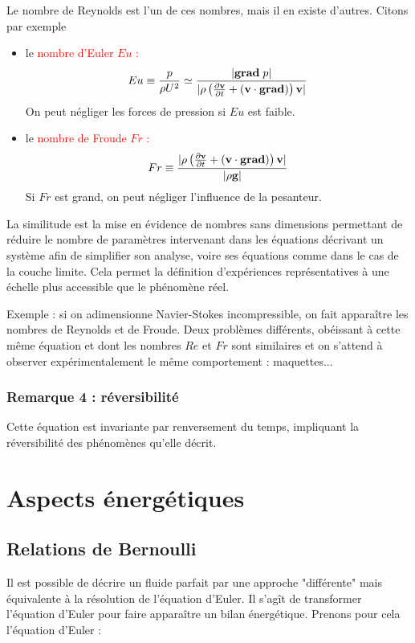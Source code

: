 \documentclass[11pt,a4paper]{report}
\begin{document}
Le nombre de Reynolds est l'un de ces nombres, mais il en existe d'autres. Citons par exemple
\begin{itemize}
	\item le \textcolor{red}{nombre d'Euler $Eu$ :}
	\begin{equation}
		\displaystyle{Eu \equiv \frac{p}{\rho U^2} \simeq \frac{|\textbf{grad}\;p|}{|\rho\left(\frac{\partial \bold{v}}{\partial t} 
		+ \left(\bold{v}\cdot\textbf{grad}\right)\right)\bold{v}|}}
	\end{equation}
	On peut négliger les forces de pression si $Eu$ est faible.
	\item le \textcolor{red}{nombre de Froude $Fr$ :}
	\begin{equation}
		\displaystyle{Fr \equiv \frac{|\rho\left(\frac{\partial \bold{v}}{\partial t} 
		+ \left(\bold{v}\cdot\textbf{grad}\right)\right)\bold{v}|}{|\rho \bold{g}|}}
	\end{equation}
	Si $Fr$ est grand, on peut négliger l'influence de la pesanteur.\\
\end{itemize}

La similitude est la mise en évidence de nombres sans dimensions permettant de réduire le nombre de paramètres intervenant dans les équations décrivant un système afin de simplifier son analyse, voire ses équations comme dans le cas de la couche limite. Cela permet la définition d'expériences représentatives à une échelle plus accessible que le phénomène réel.

Exemple : si on adimensionne Navier-Stokes incompressible, on fait apparaître les nombres de Reynolds et de Froude. Deux problèmes différents, obéissant à cette même équation et dont les nombres $Re$ et $Fr$ sont similaires et on s'attend à observer expérimentalement le même comportement : maquettes...

\subsubsection{Remarque 4 : réversibilité}

Cette équation est invariante par renversement du temps, impliquant la réversibilité des phénomènes qu'elle décrit.

\section{Aspects énergétiques}

\subsection{Relations de Bernoulli}
Il est possible de décrire un fluide parfait par une approche "différente" mais équivalente à la résolution de l'équation d'Euler. Il s'agît de transformer l'équation d'Euler pour faire apparaître un bilan énergétique. Prenons pour cela l'équation d'Euler :
\end{document}

